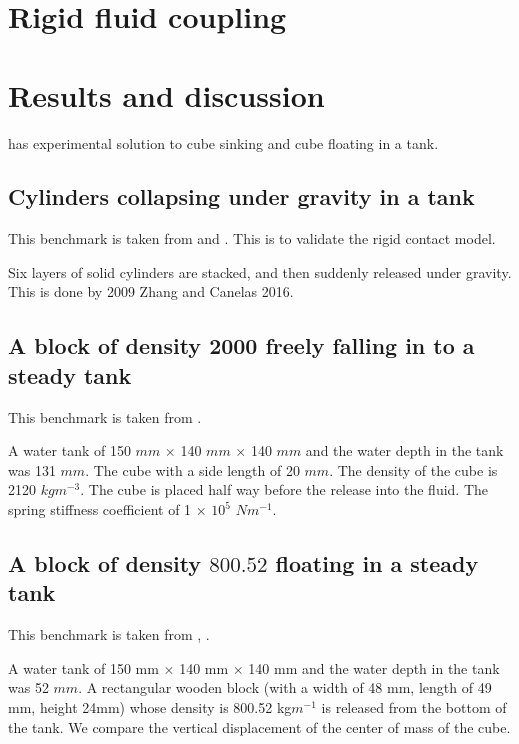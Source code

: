 \documentclass[preprint,12pt]{elsarticle}
\begin{document}
\section{Rigid fluid coupling}
\label{sec:rf-coupling}




\section{Results and discussion}
\label{sec:results}
\citet{wu2014two} has experimental solution to cube sinking and cube floating
in a tank.

\subsection{Cylinders collapsing under gravity in a tank}
\label{sec:cylinders-collapsing-dem}

This benchmark is taken from \citet{chen2019coupled} and
\citet{wang2019numerical}. This is to validate the rigid contact model.

Six layers of solid cylinders are stacked, and then suddenly released under
gravity. This is done by 2009 Zhang and Canelas 2016.


\subsection{A block of density 2000 freely falling in to a steady tank}
\label{sec:2000-density-inside-tank}

This benchmark is taken from \citet{qiu20173d}.

A water tank of 150 $mm$ $\times$ 140 $mm$ $\times$ 140 $mm$ and the water
depth in the tank was 131 $mm$. The cube with a side length of 20 $mm$. The
density of the cube is 2120 $kg m^{-3}$. The cube is placed half way before
the release into the fluid. The spring stiffness coefficient of 1 $\times$
$10^{5}$ $N m^{-1}$.


\subsection{A block of density $800.52$ floating in a steady tank}
\label{sec:800-density-floating}

This benchmark is taken from \citet{qiu20173d}, \citet{wang2019numerical}.

A water tank of 150 mm $\times$ 140 mm $\times$ 140 mm and the water depth in
the tank was 52 $mm$. A rectangular wooden block (with a width of 48 mm,
length of 49 mm, height 24mm) whose density is 800.52 kg$m^{-1}$ is
released from the bottom of the tank. We compare the vertical displacement of
the center of mass of the cube.
\end{document}
